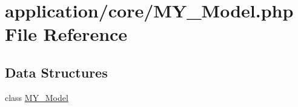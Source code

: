 \hypertarget{_m_y___model_8php}{\section{application/core/\-M\-Y\-\_\-\-Model.php File Reference}
\label{_m_y___model_8php}
}
\subsection*{Data Structures}
\begin{DoxyCompactItemize}
\item 
class \hyperlink{class_m_y___model}{M\-Y\-\_\-\-Model}
\end{DoxyCompactItemize}

